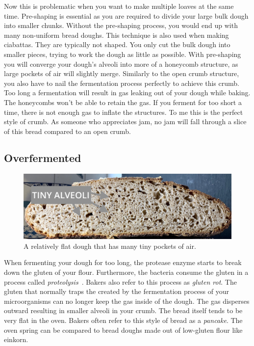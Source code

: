 Now this is problematic when you want to
make multiple loaves at the same time. Pre-shaping is essential as you are required
to divide your large bulk dough into smaller chunks. Without the pre-shaping
process, you would end up with many non-uniform bread doughs. This technique is
also used when making ciabattas. They are typically not shaped. You only cut the
bulk dough into smaller pieces, trying to work the dough as little as possible.
With pre-shaping you will converge your dough's alveoli into more of a honeycomb structure,
as large pockets of air will slightly merge. Similarly to the open crumb structure,
you also have to nail the fermentation process perfectly to achieve this crumb.
Too long a fermentation will result in gas leaking out of your dough while baking.
The honeycombs won't be able to retain the gas. If you ferment for too short a time,
there is not enough gas to inflate the structures. To me this is the perfect
style of crumb. As someone who appreciates jam, no jam will fall through a slice
of this bread compared to an open crumb.

\subsection{Overfermented}%
\label{sec:overfermented-dough}

\begin{figure}
  \includegraphics[width=\textwidth]{fermented-too-long}
  \caption{A relatively flat dough that has many tiny pockets of air.}%
  \label{fig:fermented-too-long}
\end{figure}

When fermenting your dough for too long, the protease enzyme starts to
break down the gluten of your flour. Furthermore, the bacteria consume the gluten
in a process called \emph{proteolysis}~\cite{raffaella+di+cagno}.
Bakers also refer to this process as \emph{gluten rot}.
The gluten that normally traps the  created
by the fermentation process of your microorganisms can no longer keep the
gas inside of the dough. The gas disperses outward resulting in smaller alveoli in your crumb.
The bread itself tends to be very flat in the oven. Bakers often refer
to this style of bread as a \emph{pancake}. The oven spring can be compared
to bread doughs made out of low-gluten flour like einkorn.

